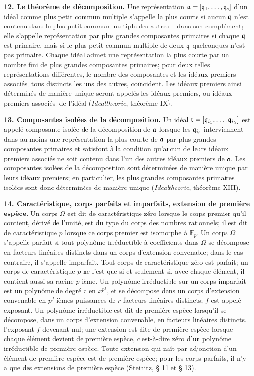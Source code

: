\textbf{12. Le théorème de décomposition.} Une représentation $\mathfrak a=[\mathfrak q_1,\ldots,\mathfrak q_s]$ d'un idéal comme plus petit commun multiple s'appelle la plus courte si aucun $\mathfrak q$ n'est contenu dans le plus petit commun multiple des autres -- dans son complément; elle s'appelle représentation par plus grandes composantes primaires si chaque $\mathfrak q$ est primaire, mais si le plus petit commun multiple de deux $\mathfrak q$ quelconques n'est pas primaire. Chaque idéal admet une représentation la plus courte par un nombre fini de plus grandes composantes primaires; pour deux telles représentations différentes, le nombre des composantes et les idéaux premiers associés, tous distincts les uns des autres, coïncident. Les idéaux premiers ainsi déterminés de manière unique seront appelés les idéaux premiers, ou idéaux premiers associés, de l'idéal (\emph{Idealtheorie}, théorème IX).

\textbf{13. Composantes isolées de la décomposition.} Un idéal $\mathfrak r=[\mathfrak q_{i_1},\ldots,\mathfrak q_{i_\lambda}]$ est appelé composante isolée de la décomposition de $\mathfrak a$ lorsque les $\mathfrak q_{i_j}$ interviennent dans au moins une représentation la plus courte de $\mathfrak a$ par plus grandes composantes primaires et satisfont à la condition qu'aucun de leurs idéaux premiers associés ne soit contenu dans l'un des autres idéaux premiers de $\mathfrak a$. Les composantes isolées de la décomposition sont déterminées de manière unique par leurs idéaux premiers; en particulier, les plus grandes composantes primaires isolées sont donc déterminées de manière unique (\emph{Idealtheorie}, théorème XIII).

\textbf{14. Caractéristique, corps parfaits et imparfaits, extension de première espèce.} Un corps $\Omega$ est dit de caractéristique zéro lorsque le corps premier qu'il contient, dérivé de l'unité, est du type du corps des nombres rationnels; il est dit de caractéristique $p$ lorsque ce corps premier est isomorphe à $\mathbb F_p$. Un corps $\Omega$ s'appelle parfait si tout polynôme irréductible à coefficients dans $\Omega$ se décompose en facteurs linéaires distincts dans un corps d'extension convenable; dans le cas contraire, il s'appelle imparfait. Tout corps de caractéristique zéro est parfait; un corps de caractéristique $p$ ne l'est que si et seulement si, avec chaque élément, il contient aussi sa racine $p$-ième. Un polynôme irréductible sur un corps imparfait est un polynôme de degré $r$ en $x^{p^f}$, et se décompose dans un corps d'extension convenable en $p^f$-ièmes puissances de $r$ facteurs linéaires distincts; $f$ est appelé exposant. Un polynôme irréductible est dit de première espèce lorsqu'il se décompose, dans un corps d'extension convenable, en facteurs linéaires distincts, l'exposant $f$ devenant nul; une extension est dite de première espèce lorsque chaque élément devient de première espèce, c'est-à-dire zéro d'un polynôme irréductible de première espèce. Toute extension qui naît par adjonction d'un élément de première espèce est de première espèce; pour les corps parfaits, il n'y a que des extensions de première espèce (Steinitz, \S{} 11 et \S{} 13).

